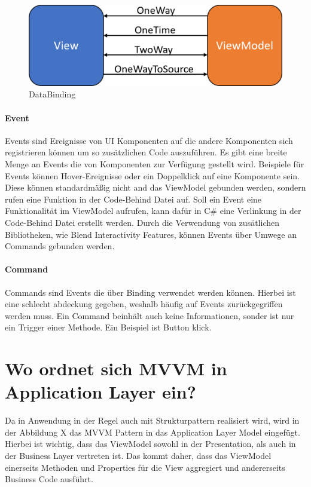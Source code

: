 \documentclass[titlepage=false,12pt]{scrreprt}
\begin{document}
\begin{figure}[h]
	\includegraphics[width=\textwidth]{Wpf_Binding.png}
	\caption[]{DataBinding}
\end{figure}


\paragraph{Event}

Events sind Ereignisse von UI Komponenten auf die andere Komponenten sich registrieren 
können um so zusätzlichen Code auszuführen. Es gibt eine breite Menge an Events die
von Komponenten zur Verfügung gestellt wird. Beispiele für Events können Hover-Ereignisse
oder ein Doppelklick auf eine Komponente sein.
Diese können standardmäßig nicht and das ViewModel
gebunden werden, sondern rufen eine Funktion in der Code-Behind Datei auf.
Soll ein Event eine Funktionalität im ViewModel aufrufen, kann dafür in C\# eine Verlinkung in der
Code-Behind Datei erstellt werden. Durch die Verwendung von zusätlichen Bibliotheken, wie
Blend Interactivity Features, können Events über Umwege an Commands gebunden werden.

\paragraph{Command}

Commands sind Events die über Binding verwendet werden können. Hierbei ist eine schlecht
abdeckung gegeben, weshalb häufig auf Events zurückgegriffen werden muss. Ein Command
beinhält auch keine Informationen, sonder ist nur ein Trigger einer Methode. Ein Beispiel
ist Button klick.

\section{Wo ordnet sich MVVM in Application Layer ein?}

Da in Anwendung in der Regel auch mit Strukturpattern realisiert wird, wird in der Abbildung X
das MVVM Pattern in das Application Layer Model eingefügt. Hierbei ist wichtig, dass das
ViewModel sowohl in der Presentation, als auch in der Business Layer vertreten ist. Das kommt
daher, dass das ViewModel einerseits Methoden und Properties für die View aggregiert und andererseits
Business Code ausführt.  
\end{document}
